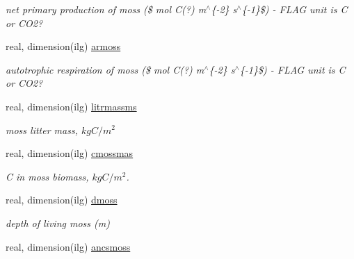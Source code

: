 \begin{DoxyCompactItemize}
\begin{DoxyCompactList}\small\item\em net primary production of moss (\$ mol C(?) m$^\wedge$\{-\/2\} s$^\wedge$\{-\/1\}\$) -\/ F\+L\+A\+G unit is C or C\+O2? \end{DoxyCompactList}\item 
\hypertarget{structctem__statevars_1_1veg__gat_a81bba029245578be36fc61e12e26f482}{}real, dimension(ilg) \hyperlink{structctem__statevars_1_1veg__gat_a81bba029245578be36fc61e12e26f482}{armoss}\label{structctem__statevars_1_1veg__gat_a81bba029245578be36fc61e12e26f482}

\begin{DoxyCompactList}\small\item\em autotrophic respiration of moss (\$ mol C(?) m$^\wedge$\{-\/2\} s$^\wedge$\{-\/1\}\$) -\/ F\+L\+A\+G unit is C or C\+O2? \end{DoxyCompactList}\item 
\hypertarget{structctem__statevars_1_1veg__gat_a3b881474a86d8fc85e6cf72f15f9c876}{}real, dimension(ilg) \hyperlink{structctem__statevars_1_1veg__gat_a3b881474a86d8fc85e6cf72f15f9c876}{litrmassms}\label{structctem__statevars_1_1veg__gat_a3b881474a86d8fc85e6cf72f15f9c876}

\begin{DoxyCompactList}\small\item\em moss litter mass, $kg C/m^2$ \end{DoxyCompactList}\item 
\hypertarget{structctem__statevars_1_1veg__gat_a61630732de77398f2163d1f4cc54ef4a}{}real, dimension(ilg) \hyperlink{structctem__statevars_1_1veg__gat_a61630732de77398f2163d1f4cc54ef4a}{cmossmas}\label{structctem__statevars_1_1veg__gat_a61630732de77398f2163d1f4cc54ef4a}

\begin{DoxyCompactList}\small\item\em C in moss biomass, $kg C/m^2$. \end{DoxyCompactList}\item 
\hypertarget{structctem__statevars_1_1veg__gat_af2f0850a504fff247ffd5687ec41e05a}{}real, dimension(ilg) \hyperlink{structctem__statevars_1_1veg__gat_af2f0850a504fff247ffd5687ec41e05a}{dmoss}\label{structctem__statevars_1_1veg__gat_af2f0850a504fff247ffd5687ec41e05a}

\begin{DoxyCompactList}\small\item\em depth of living moss (m) \end{DoxyCompactList}\item 
\hypertarget{structctem__statevars_1_1veg__gat_ae2173429a63a8e2139195d96bf0552f0}{}real, dimension(ilg) \hyperlink{structctem__statevars_1_1veg__gat_ae2173429a63a8e2139195d96bf0552f0}{ancsmoss}\label{structctem__statevars_1_1veg__gat_ae2173429a63a8e2139195d96bf0552f0}


\end{DoxyCompactItemize}
